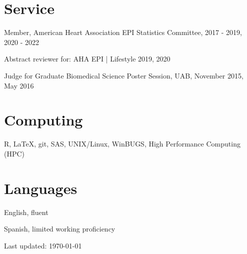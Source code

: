 \documentclass[10pt,letterpaper]{article}
\renewenvironment{itemize}{
  \begin{list}{}{
    \setlength{\leftmargin}{1.5em}
    \setlength{\itemsep}{0.25em}
    \setlength{\parskip}{0pt}
    \setlength{\parsep}{0.25em}
  }
}{
  \end{list}
}
\begin{document}
\section*{Service}
\begin{itemize}
    \item Member, American Heart Association EPI Statistics Committee, 2017 - 2019, 2020 - 2022
    \item Abstract reviewer for: AHA EPI | Lifestyle 2019, 2020
	\item Judge for Graduate Biomedical Science Poster Session, UAB, November 2015, May 2016
\end{itemize}

\section*{Computing}
\begin{itemize}
    \item R, \LaTeX, git, SAS, UNIX/Linux, WinBUGS, High Performance Computing (HPC)
\end{itemize}

\section*{Languages}
\begin{itemize}
	\item English, fluent
	\item Spanish, limited working proficiency
\end{itemize}
\medskip

\begin{center}
  \begin{small}
    Last updated: \today
  \end{small}
\end{center}
\end{document}
